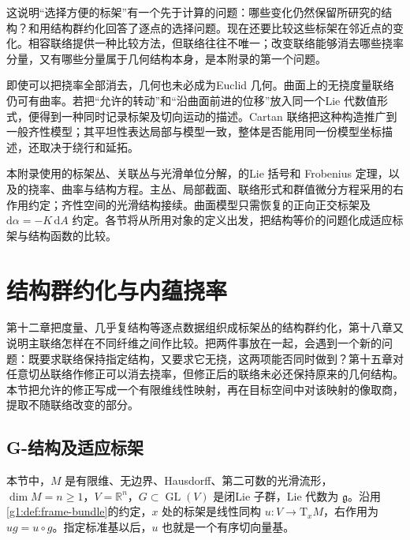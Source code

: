 \ProseParagraphBreak

这说明“选择方便的标架”有一个先于计算的问题：哪些变化仍然保留所研究的结构？和用结构群约化回答了逐点的选择问题。现在还要比较这些标架在邻近点的变化。相容联络提供一种比较方法，但联络往往不唯一；改变联络能够消去哪些挠率分量，又有哪些分量属于几何结构本身，是本附录的第一个问题。

\ProseParagraphBreak

即使可以把挠率全部消去，几何也未必成为Euclid 几何。曲面上的无挠度量联络仍可有曲率。若把“允许的转动”和“沿曲面前进的位移”放入同一个Lie 代数值形式，便得到一种同时记录标架及切向运动的描述。Cartan 联络把这种构造推广到一般齐性模型；其平坦性表达局部与模型一致，整体是否能用同一份模型坐标描述，还取决于绕行和延拓。

\ProseParagraphBreak

本附录使用的标架丛、关联丛与光滑单位分解，的Lie 括号和 Frobenius 定理，以及的挠率、曲率与结构方程。主丛、局部截面、联络形式和群值微分方程采用的右作用约定；齐性空间的光滑结构接续。曲面模型只需恢复的正向正交标架及 \(\mathrm{d}\alpha=-K\,\mathrm{d}A\) 约定。各节将从所用对象的定义出发，把结构等价的问题化成适应标架与结构函数的比较。

\section{结构群约化与内蕴挠率}
\label{g1:sec:D01}

第十二章把度量、几乎复结构等逐点数据组织成标架丛的结构群约化，第十八章又说明主联络怎样在不同纤维之间作比较。把两件事放在一起，会遇到一个新的问题：既要求联络保持指定结构，又要求它无挠，这两项能否同时做到？第十五章对任意切丛联络作修正可以消去挠率，但修正后的联络未必还保持原来的几何结构。本节把允许的修正写成一个有限维线性映射，再在目标空间中对该映射的像取商，提取不随联络改变的部分。

\subsection{G-结构及适应标架}
\label{g1:subsec:D01:01}

本节中，\(M\) 是有限维、无边界、Hausdorff、第二可数的光滑流形，\(\dim M=n\geq1\)，\(V=\mathbb R^n\)，\(G\subset\operatorname{GL}(V)\) 是闭Lie 子群，Lie 代数为 \(\mathfrak g\)。沿用\cref{g1:def:frame-bundle}的约定，\(x\) 处的标架是线性同构 \(u:V\to\mathrm{T}_xM\)，右作用为 \(u g=u\circ g\)。指定标准基以后，\(u\) 也就是一个有序切向量基。

